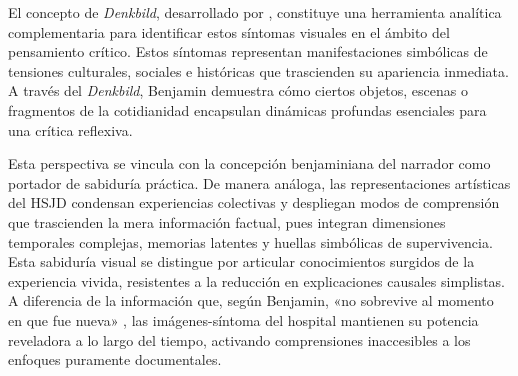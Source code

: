 El concepto de \textit{Denkbild}, desarrollado por \parencite{Benjamin2004}, constituye una herramienta analítica complementaria para identificar estos síntomas visuales en el ámbito del pensamiento crítico. Estos síntomas representan manifestaciones simbólicas de tensiones culturales, sociales e históricas que trascienden su apariencia inmediata. A través del \textit{Denkbild}, Benjamin demuestra cómo ciertos objetos, escenas o fragmentos de la cotidianidad encapsulan dinámicas profundas esenciales para una crítica reflexiva.

Esta perspectiva se vincula con la concepción benjaminiana del narrador como portador de sabiduría práctica. De manera análoga, las representaciones artísticas del HSJD condensan experiencias colectivas y despliegan modos de comprensión que trascienden la mera información factual, pues integran dimensiones temporales complejas, memorias latentes y huellas simbólicas de supervivencia. Esta sabiduría visual se distingue por articular conocimientos surgidos de la experiencia vivida, resistentes a la reducción en explicaciones causales simplistas. A diferencia de la información que, según Benjamin, «no sobrevive al momento en que fue nueva» \parencite{Benjamin1968Storyteller}, las imágenes-síntoma del hospital mantienen su potencia reveladora a lo largo del tiempo, activando comprensiones inaccesibles a los enfoques puramente documentales.


